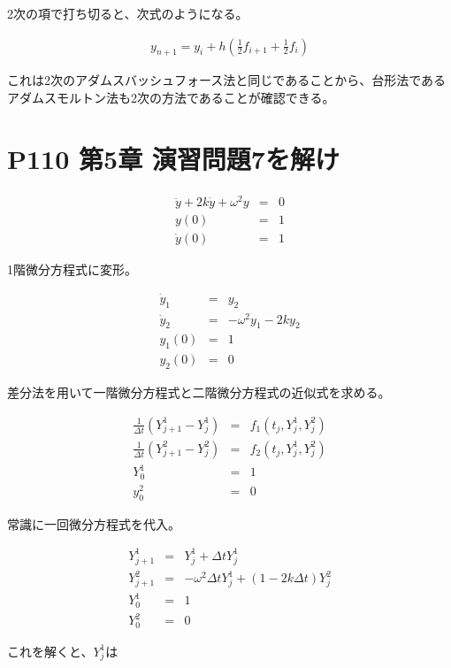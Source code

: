 \documentclass[]{jsarticle}
\begin{document}
2次の項で打ち切ると、次式のようになる。

\begin{eqnarray*}
y_{n+1} = y_{i} + h(\frac{1}{2} f_{i+1} + \frac{1}{2} f_{i})
\end{eqnarray*}

これは2次のアダムスバッシュフォース法と同じであることから、台形法であるアダムスモルトン法も2次の方法であることが確認できる。


\section{P110 第5章 演習問題7を解け}

\begin{eqnarray*}
\ddot{y} + 2k\dot{y} + \omega ^{2} y &=& 0 \\
y(0) &=& 1 \\
\dot{y}(0) &=& 1
\end{eqnarray*}

1階微分方程式に変形。

\begin{eqnarray*}
\dot{y}_{1} &=& y_{2}\\
\dot{y}_{2} &=& - \omega ^{2} y_{1} - 2k y_{2}\\
y_{1}(0) &=& 1\\
y_{2}(0) &=& 0 
\end{eqnarray*}

差分法を用いて一階微分方程式と二階微分方程式の近似式を求める。

\begin{eqnarray*}
\frac{1}{\Delta t}(Y^{1}_{j+1} - Y^{1}_{j}) &=& f_{1}(t_{j}, Y_{j}^{1}, Y_{j}^{2})\\
\frac{1}{\Delta t}(Y^{2}_{j+1} - Y^{2}_{j}) &=& f_{2}(t_{j}, Y_{j}^{1}, Y_{j}^{2})\\
Y^{1}_{0} &=& 1\\
y^{2}_{0} &=& 0 
\end{eqnarray*}

常識に一回微分方程式を代入。

\begin{eqnarray*}
Y^{1}_{j+1} &=& Y^{1}_{j} + \Delta t Y_{j}^{1}\\
Y^{2}_{j+1} &=& -\omega^{2} \Delta t Y_{j}^{1} + (1-2k\Delta t)Y_{j}^{2}\\
Y_{0}^{1} &=& 1\\
Y_{0}^{2} &=& 0
\end{eqnarray*}

これを解くと、$Y_{j}^{1}$は
\end{document}
